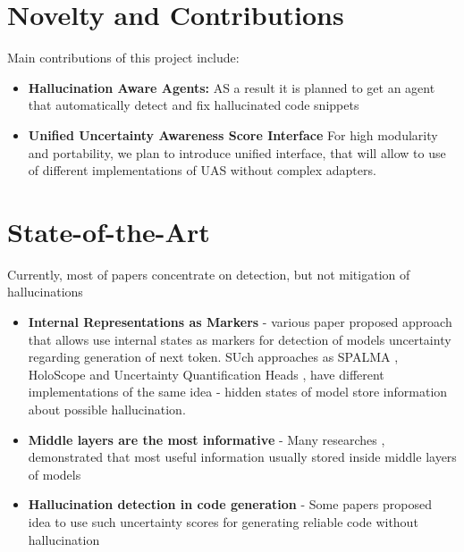 \documentclass[11pt,a4paper]{article}
\begin{document}
\section{Novelty and Contributions}

Main contributions of this project include:

\begin{itemize}

    \item \textbf{Hallucination Aware Agents:}
    AS a result it is planned to get an agent that automatically detect
    and fix hallucinated code snippets

    \item \textbf{Unified Uncertainty Awareness Score Interface}
    For high modularity and portability, we plan to introduce unified
    interface, that will allow to use of different implementations of UAS
    without complex adapters.

\end{itemize}


\section{State-of-the-Art}

Currently, most of papers concentrate on detection, but not
mitigation of hallucinations

\begin{itemize}
    \item \textbf{Internal Representations as Markers} - various paper proposed
    approach that allows use internal states as markers for detection of models
    uncertainty regarding generation of next token. SUch approaches as SPALMA \cite{azaria2023internalstatellmknows}, HoloScope \cite{du2024haloscopeharnessingunlabeledllm}
    and Uncertainty Quantification Heads \cite{shelmanov2025headpredictheadquestion}, have different implementations of the same 
    idea - hidden states of model store information about possible hallucination.
    \item \textbf{Middle layers are the most informative} - Many researches \cite{azaria2023internalstatellmknows}, \cite{duan2024llmsknowhallucinationempirical} demonstrated 
    that most useful information usually stored inside middle layers of models
    \item \textbf{Hallucination detection in code generation} - Some papers \cite{andriushchenko2026efficient} proposed idea
    to use such uncertainty scores for generating reliable code without hallucination 
\end{itemize}
\end{document}
